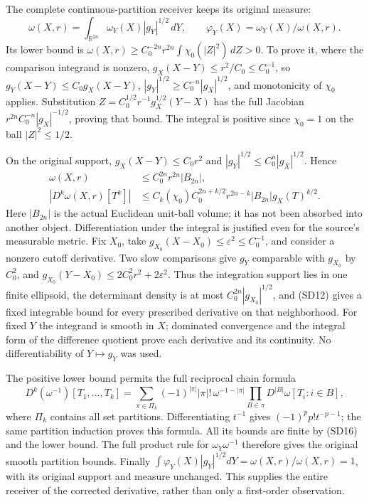 \documentclass[
  11pt,
]{article}
\begin{document}
The complete continuous-partition receiver keeps its original measure:
\[
 \omega(X,r)=\int_{\mathbb R^{2n}}\omega_Y(X)|g_Y|^{1/2}\,dY,
 \qquad \varphi_Y(X)=\omega_Y(X)/\omega(X,r).
 \tag{SD15}
\] Its lower bound is
\(\omega(X,r)\ge C_0^{-2n}r^{2n}\int\chi_0(|Z|^2)\,dZ>0\). To prove it,
where the comparison integrand is nonzero,
\(g_X(X-Y)\le r^2/C_0\le C_0^{-1}\), so \(g_Y(X-Y)\le C_0g_X(X-Y)\),
\(|g_Y|^{1/2}\ge C_0^{-n}|g_X|^{1/2}\), and monotonicity of \(\chi_0\)
applies. Substitution \(Z=C_0^{1/2}r^{-1}g_X^{1/2}(Y-X)\) has the full
Jacobian \(r^{2n}C_0^{-n}|g_X|^{-1/2}\), proving that bound. The
integral is positive since \(\chi_0=1\) on the ball \(|Z|^2\le1/2\).

On the original support, \(g_X(X-Y)\le C_0r^2\) and
\(|g_Y|^{1/2}\le C_0^n|g_X|^{1/2}\). Hence \[
 \begin{aligned}
 \omega(X,r)&\le C_0^{2n}r^{2n}|B_{2n}|,\\
 |D^k\omega(X,r)[T^k]|
 &\le C_k(\chi_0)C_0^{2n+k/2}r^{2n-k}|B_{2n}|g_X(T)^{k/2}.
 \end{aligned}
 \tag{SD16}
\] Here \(|B_{2n}|\) is the actual Euclidean unit-ball volume; it has
not been absorbed into another object. Differentiation under the
integral is justified even for the source's measurable metric. Fix
\(X_0\), take \(g_{X_0}(X-X_0)\le\varepsilon^2\le C_0^{-1}\), and
consider a nonzero cutoff derivative. Two slow comparisons give \(g_Y\)
comparable with \(g_{X_0}\) by \(C_0^2\), and
\(g_{X_0}(Y-X_0)\le2C_0^2r^2+2\varepsilon^2\). Thus the integration
support lies in one finite ellipsoid, the determinant density is at most
\(C_0^{2n}|g_{X_0}|^{1/2}\), and (SD12) gives a fixed integrable bound
for every prescribed derivative on that neighborhood. For fixed \(Y\)
the integrand is smooth in \(X\); dominated convergence and the integral
form of the difference quotient prove each derivative and its
continuity. No differentiability of \(Y\mapsto g_Y\) was used.

The positive lower bound permits the full reciprocal chain formula \[
 D^k(\omega^{-1})[T_1,\ldots,T_k]
 =\sum_{\pi\in\Pi_k}(-1)^{|\pi|}|\pi|!\,
 \omega^{-1-|\pi|}\prod_{B\in\pi}D^{|B|}\omega[T_i:i\in B],
 \tag{SD17}
\] where \(\Pi_k\) contains all set partitions. Differentiating
\(t^{-1}\) gives \((-1)^p p!t^{-p-1}\); the same partition induction
proves this formula. All its bounds are finite by (SD16) and the lower
bound. The full product rule for \(\omega_Y\omega^{-1}\) therefore gives
the original smooth partition bounds. Finally
\(\int\varphi_Y(X)|g_Y|^{1/2}dY=\omega(X,r)/\omega(X,r)=1\), with its
original support and measure unchanged. This supplies the entire
receiver of the corrected derivative, rather than only a first-order
observation.
\end{document}
